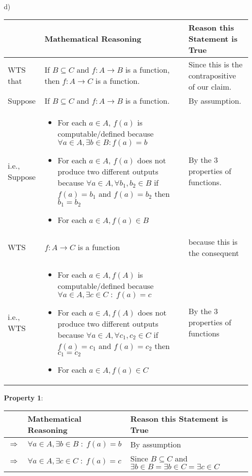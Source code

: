 \documentclass{article}
\begin{document}
d)\vspace{1pt}
\begin{flushleft}
    \begin{tabular}{|p{1.3cm}|p{5.4cm}|p{5.8cm}|}
        \hline
         & \textbf{Mathematical Reasoning} & \textbf{Reason this Statement is True} \\
        \hline
        WTS that & If $B \subseteq C$ and $f : A \rightarrow B$ is a function, then $f : A \rightarrow C$ is a function. & Since this is the contrapositive of our claim.\\
        \hline
        Suppose & If $B \subseteq C$ and $f : A \rightarrow B$ is a function. & By assumption. \\
        \hline
        i.e., Suppose & \begin{itemize}
        \item For each $a\in A$, $f(a)$ is computable/defined because $\forall a\in A, \exists b\in B\colon f(a)=b$
        \item For each $a\in A$, $f(a)$ does not produce two different outputs because $\forall a\in A,\forall b_1,b_2\in B$ if $f(a)=b_1$ and $f(a)=b_2$ then $b_1=b_2$
        \item For each $a\in A, f(a)\in B$
\end{itemize} & By the 3 properties of functions.\\
        \hline
        WTS & $f: A \rightarrow C$ is a function & because this is the consequent \\
        \hline
        i.e., WTS & \begin{itemize}
        \item For each $a\in A, f(A)$ is computable/defined because $\forall a\in A, \exists c\in C\;\colon\;f(a)=c$
    \item For each $a\in A, f(A)$ does not produce two different outputs because $\forall a\in A,\forall c_1,c_2\in C$ if $f(a)=c_1$ and $f(a)=c_2$ then $c_1=c_2$
    \item For each $a\in A, f(a)\in C$ 
    \end{itemize} & By the 3 properties of functions \\
    \hline
        
    \end{tabular}
\end{flushleft}\vspace{10pt}
\pagebreak

\textbf{Property 1}:
\begin{flushleft}
    \begin{tabular}{|p{1.3cm}|p{5.4cm}|p{5.8cm}|}
         \hline
         & \textbf{Mathematical Reasoning} & \textbf{Reason this Statement is True} \\
        \hline
        $\Rightarrow$ & $\forall a\in A, \exists b\in B\;\colon\;f(a)=b$ & By assumption\\
        \hline
        $\Rightarrow$ & $\forall a\in A, \exists c\in C\;\colon\;f(a)=c$ & Since $B\subseteq C$ and $\exists b\in B=\exists b\in C=\exists c\in C$ \\
        \hline
    \end{tabular}
\end{flushleft}\vspace{10pt}
\end{document}
